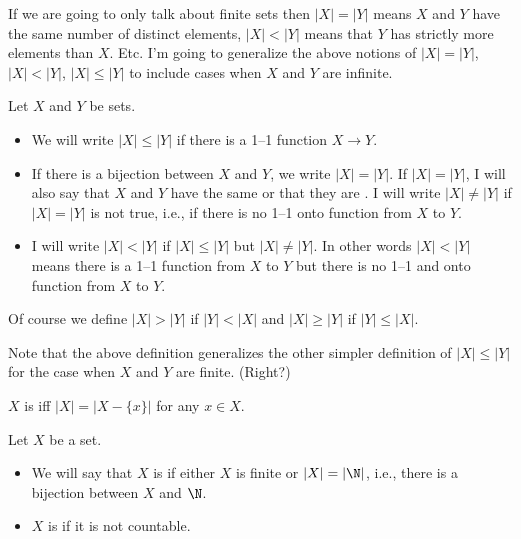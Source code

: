 If we are going to only talk about finite sets
then $|X| = |Y|$ means $X$ and $Y$ have the same number of
distinct elements,
$|X| < |Y|$ means that $Y$ has strictly more elements than
$X$.
Etc.
I'm going to generalize the above notions of
$|X| = |Y|$, $|X| < |Y|$, $|X| \leq |Y|$ to include cases when
$X$ and $Y$ are infinite.

\begin{defn}
  Let $X$ and $Y$ be sets.
  \begin{itemize}
  \item
    We will write $|X| \leq |Y|$ if there is a
    1--1 function $X \rightarrow Y$.
  \item
    If there is a bijection between
    $X$ and $Y$, we write $|X| = |Y|$.
    If $|X| = |Y|$, I will also say that $X$ and $Y$
    have the same
    or that they are
    \sidebarskip{12pt}.
    I will write $|X| \neq |Y|$
    if $|X| = |Y|$ is not true, i.e., if there is no 1--1 onto function
    from $X$ to $Y$.
  \item
    I will write $|X| < |Y|$ if
    $|X| \leq |Y|$ but $|X| \neq |Y|$.
    In other words $|X| < |Y|$ means there is a 1--1 function
    from $X$ to $Y$ but there is no 1--1 and onto function
    from $X$ to $Y$.
  \end{itemize}
  Of course we define $|X| > |Y|$ if $|Y| < |X|$ and
  $|X| \geq |Y|$ if $|Y| \leq |X|$.
\end{defn}

Note that the above definition generalizes
the other simpler definition of $|X| \leq |Y|$ for the case
when $X$ and $Y$ are finite.
(Right?)

\begin{defn}
  $X$ is  iff $|X| = |X - \{x\}|$ for any $x \in X$.
\end{defn}



\begin{defn}
  Let $X$ be a set.
  \begin{itemize}
  \item
    We will say that $X$ is  if
    either $X$ is finite or $|X| = |\N|$, i.e.,
    there is a bijection between $X$ and
    $\N$.
  \item
    $X$ is  if it is not countable.
  \end{itemize}
\end{defn}

